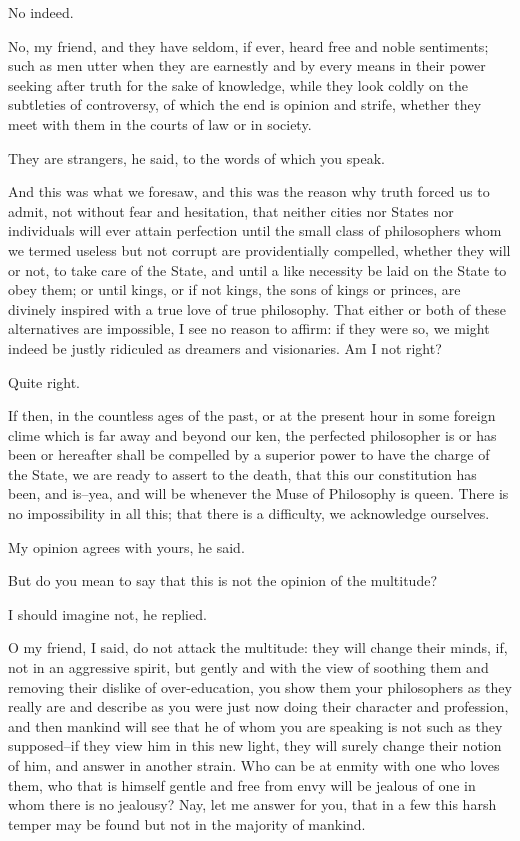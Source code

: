 No indeed.

No, my friend, and they have seldom, if ever, heard free and noble
sentiments; such as men utter when they are earnestly and by every means
in their power seeking after truth for the sake of knowledge, while
they look coldly on the subtleties of controversy, of which the end is
opinion and strife, whether they meet with them in the courts of law or
in society.

They are strangers, he said, to the words of which you speak.

And this was what we foresaw, and this was the reason why truth forced
us to admit, not without fear and hesitation, that neither cities nor
States nor individuals will ever attain perfection until the small
class of philosophers whom we termed useless but not corrupt are
providentially compelled, whether they will or not, to take care of the
State, and until a like necessity be laid on the State to obey them; or
until kings, or if not kings, the sons of kings or princes, are divinely
inspired with a true love of true philosophy. That either or both of
these alternatives are impossible, I see no reason to affirm: if
they were so, we might indeed be justly ridiculed as dreamers and
visionaries. Am I not right?

Quite right.

If then, in the countless ages of the past, or at the present hour in
some foreign clime which is far away and beyond our ken, the perfected
philosopher is or has been or hereafter shall be compelled by a superior
power to have the charge of the State, we are ready to assert to the
death, that this our constitution has been, and is--yea, and will be
whenever the Muse of Philosophy is queen. There is no impossibility in
all this; that there is a difficulty, we acknowledge ourselves.

My opinion agrees with yours, he said.

But do you mean to say that this is not the opinion of the multitude?

I should imagine not, he replied.

O my friend, I said, do not attack the multitude: they will change their
minds, if, not in an aggressive spirit, but gently and with the view
of soothing them and removing their dislike of over-education, you show
them your philosophers as they really are and describe as you were just
now doing their character and profession, and then mankind will see that
he of whom you are speaking is not such as they supposed--if they view
him in this new light, they will surely change their notion of him, and
answer in another strain. Who can be at enmity with one who loves them,
who that is himself gentle and free from envy will be jealous of one
in whom there is no jealousy? Nay, let me answer for you, that in a few
this harsh temper may be found but not in the majority of mankind.

